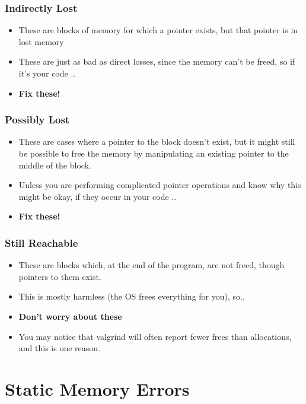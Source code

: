 \documentclass{beamer}
\begin{document}
\begin{frame}[fragile]
\frametitle{Indirectly Lost}
\begin{itemize}
\item These are blocks of memory for which a pointer exists, but that pointer is in lost memory
\item These are just as bad as direct losses, since the memory can't be freed, so if it's your code ..
\item \textbf{Fix these!}
\end{itemize}
\end{frame}

\begin{frame}[fragile]
\frametitle{Possibly Lost}
\begin{itemize}
\item These are cases where a pointer to the block doesn't exist, but it might still be possible to free the memory by manipulating an existing pointer to the middle of the block.
\item Unless you are performing complicated pointer operations and know why this might be okay, if they occur in your code ..
\item \textbf{Fix these!}
\end{itemize}
\end{frame}

\begin{frame}[fragile]
\frametitle{Still Reachable}
\begin{itemize}
\item These are blocks which, at the end of the program, are not freed, though pointers to them exist.
\item This is mostly harmless (the OS frees everything for you), so..
\item \textbf{Don't worry about these}
  \item You may notice that valgrind will often report fewer frees than allocations, and this is one reason.
\end{itemize}
\end{frame}

\section{Static Memory Errors}
\end{document}
